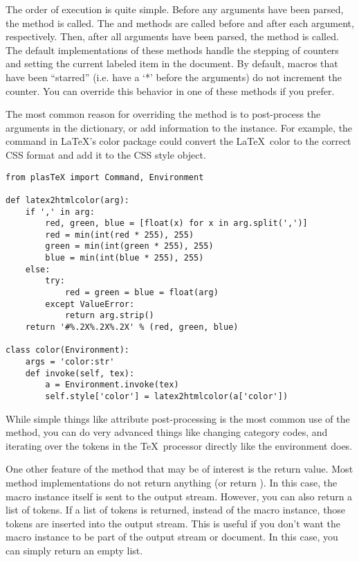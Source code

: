 The order of execution is quite simple.  Before any arguments have been
parsed, the  method is called.  The 
and  methods are called before and after each
argument, respectively.  Then, after all arguments have been parsed, the
 method is called.  The default implementations of 
these methods handle the stepping of counters and setting the 
current labeled item in the document.  By default, macros that have
been ``starred'' (i.e. have a `*' before the arguments) do not 
increment the counter.  You can override this behavior in one of these
methods if you prefer.

The most common reason for overriding the  method is to
post-process the arguments in the  dictionary, or
add information to the instance.
For example, the  command in \LaTeX's color package
could convert the \LaTeX\ color to the correct CSS format
and add it to the CSS style object.
\begin{verbatim}
from plasTeX import Command, Environment

def latex2htmlcolor(arg):
    if ',' in arg:
        red, green, blue = [float(x) for x in arg.split(',')]
        red = min(int(red * 255), 255)
        green = min(int(green * 255), 255)
        blue = min(int(blue * 255), 255)
    else:
        try:
            red = green = blue = float(arg)
        except ValueError:
            return arg.strip()
    return '#%.2X%.2X%.2X' % (red, green, blue)

class color(Environment):
    args = 'color:str'
    def invoke(self, tex):
        a = Environment.invoke(tex)
        self.style['color'] = latex2htmlcolor(a['color'])
\end{verbatim}

While simple things like attribute post-processing is the most common
use of the  method, you can do very advanced things
like changing category codes, and iterating over the tokens in the
\TeX\ processor directly like the  environment
does.

One other feature of the  method that may be of interest
is the return value.  Most  method implementations do
not return anything (or return ).  In this case, the macro
instance itself is sent to the output stream.  However, you can also
return a list of tokens.  If a list of tokens is returned, instead of
the macro instance, those tokens are inserted into the output stream.
This is useful if you don't want the macro instance to be part of the
output stream or document.  In this case, you can simply return an
empty list.


